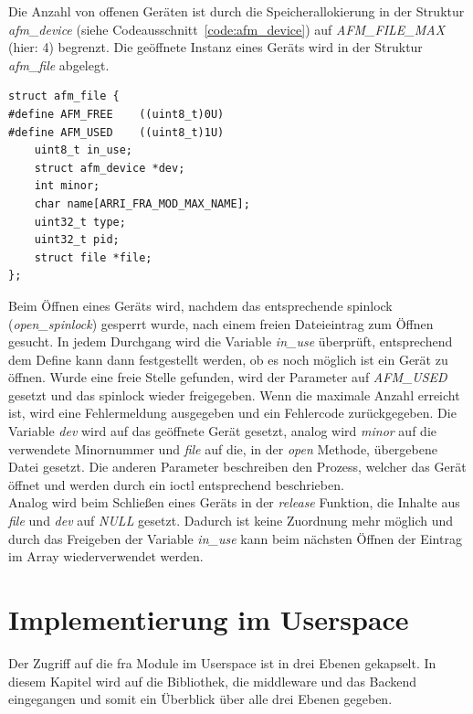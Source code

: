 Die Anzahl von offenen Geräten ist durch die Speicherallokierung in der Struktur \textit{afm\_device} (siehe Codeausschnitt~\ref{code:afm_device}) auf \textit{AFM\_FILE\_MAX} (hier: 4) begrenzt. Die geöffnete Instanz eines Geräts wird in der Struktur \textit{afm\_file} abgelegt.

\begin{lstfloat}
\begin{lstlisting}
struct afm_file {  
#define AFM_FREE    ((uint8_t)0U)
#define AFM_USED    ((uint8_t)1U)
	uint8_t in_use;
	struct afm_device *dev;
	int minor;
	char name[ARRI_FRA_MOD_MAX_NAME];
	uint32_t type;
	uint32_t pid;
	struct file *file;
};
\end{lstlisting}
\end{lstfloat}

Beim Öffnen eines Geräts wird, nachdem das entsprechende \gls{spinlock} (\textit{open\_spinlock}) gesperrt wurde, nach einem freien Dateieintrag zum Öffnen gesucht. In jedem Durchgang wird die Variable \textit{in\_use} überprüft, entsprechend dem Define kann dann festgestellt werden, ob es noch möglich ist ein Gerät zu öffnen. Wurde eine freie Stelle gefunden, wird der Parameter auf \textit{AFM\_USED} gesetzt und das \gls{spinlock} wieder freigegeben.
Wenn die maximale Anzahl erreicht ist, wird eine Fehlermeldung ausgegeben und ein Fehlercode zurückgegeben.
Die Variable \textit{dev} wird auf das geöffnete Gerät gesetzt, analog wird \textit{minor} auf die verwendete Minornummer und \textit{file} auf die, in der \textit{open} Methode, übergebene Datei gesetzt. 
Die anderen Parameter beschreiben den Prozess, welcher das Gerät öffnet und werden durch ein \ac{ioctl} entsprechend beschrieben.\\

Analog wird beim Schließen eines Geräts in der \textit{release} Funktion, die Inhalte aus \textit{file} und \textit{dev} auf \textit{NULL} gesetzt. Dadurch ist keine Zuordnung mehr möglich und durch das Freigeben der Variable \textit{in\_use} kann beim nächsten Öffnen der Eintrag im Array wiederverwendet werden.


\section{Implementierung im Userspace}\label{sec:user}
Der Zugriff auf die \ac{fra} Module im Userspace ist in drei Ebenen gekapselt. In diesem Kapitel wird auf die Bibliothek, die \gls{middleware} und das Backend eingegangen und somit ein Überblick über alle drei Ebenen gegeben.


